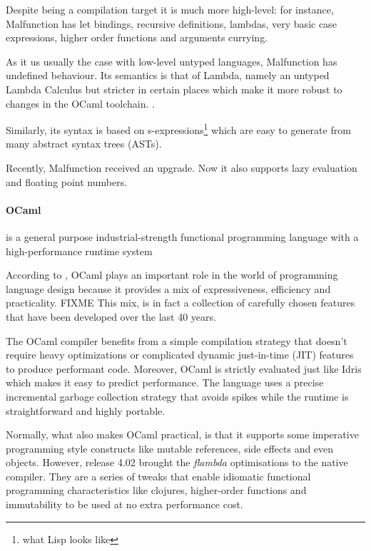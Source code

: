 \documentclass[a4paper,twocolumn]{article}
\begin{document}
Despite being a compilation target it is much more high-level:
for instance, Malfunction has
let bindings, recursive definitions, lambdas, very basic case
expressions, higher order functions and arguments currying.

As it us usually the case with low-level untyped languages, Malfunction
has undefined behaviour.
Its semantics is that of Lambda, namely an untyped Lambda Calculus but
stricter in certain places which make it more robust to changes in the
OCaml toolchain. \cite{dolan2016malfunctional}.

Similarly, its syntax is based on s-expressions\footnote{
    what Lisp looks like
} which are easy to generate from many abstract syntax trees (ASTs).

Recently, Malfunction received an upgrade.
Now it also supports lazy evaluation and
floating point numbers.


\paragraph{OCaml} is a general purpose industrial-strength functional
programming language with a high-performance runtime system

According to \cite{rwocaml}, OCaml plays an important role in the
world of programming language design because it provides a mix
of expressiveness, efficiency and practicality.
FIXME This mix, is in fact a collection of carefully chosen features
that have been developed over the last 40 years.


The OCaml compiler benefits from a simple
compilation strategy that doesn't require heavy optimizations or
complicated dynamic just-in-time (JIT) features to produce performant
code. Moreover, OCaml is strictly evaluated just like Idris which
makes it easy to predict performance.
The language uses  a precise incremental garbage collection strategy
that avoids spikes while the runtime is straightforward and highly
portable.

Normally, what also makes OCaml practical, is that it supports some
imperative programming style constructs like mutable references,
side effects and even objects.
However, release 4.02 brought the \emph{flambda} optimisations to the
native compiler. They are a series of tweaks
that enable idiomatic functional programming characteristics like clojures,
higher-order functions and immutability to be used at no extra
performance cost.\cite{leroy2014ocaml}
\end{document}
